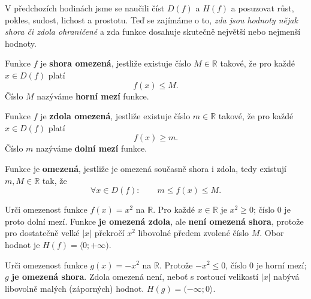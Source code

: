 \documentclass[11pt,a4paper]{article}
\begin{document}

V předchozích hodinách jsme se naučili číst $D(f)$ a $H(f)$
a posuzovat růst, pokles, sudost, lichost a prostotu.
Teď se zajímáme o to, \emph{zda jsou hodnoty nějak shora
či zdola ohraničené} a zda funkce dosahuje skutečně největší
nebo nejmenší hodnoty.

\begin{definiceBox}[title={Definice - Shora omezená funkce}]
Funkce $f$ je \textbf{shora omezená}, jestliže existuje
číslo $M\in\mathbb R$ takové, že pro každé $x\in D(f)$ platí
\[
f(x)\le M.
\]
Číslo $M$ nazýváme \textbf{horní mezí} funkce.
\end{definiceBox}
\begin{definiceBox}[title={Definice - Zdola omezená funkce}]
Funkce $f$ je \textbf{zdola omezená}, jestliže existuje
číslo $m\in\mathbb R$ takové, že pro každé $x\in D(f)$ platí
\[
f(x)\ge m.
\]
Číslo $m$ nazýváme \textbf{dolní mezí} funkce.
\end{definiceBox}
\begin{definiceBox}[title={Definice - Omezená funkce}]
Funkce je \textbf{omezená}, jestliže je omezená současně
shora i zdola, tedy existují $m,M\in\mathbb R$ tak, že
\[
\forall x\in D(f):\qquad m\le f(x)\le M.
\]
\end{definiceBox}

\begin{prikladReseniBox}[title={Příklad 1}]
Urči omezenost funkce $f(x)=x^2$ na $\mathbb R$.
\tcblower
Pro každé $x\in\mathbb R$ je $x^2\ge0$; číslo $0$ je
proto dolní mezí. Funkce \textbf{je omezená zdola},
ale \textbf{není omezená shora}, protože pro dostatečně velké
$|x|$ překročí $x^2$ libovolné předem zvolené číslo $M$.
Obor hodnot je $H(f)=\langle0;+\infty)$.
\end{prikladReseniBox}

\begin{prikladReseniBox}[title={Příklad 2}]
Urči omezenost funkce $g(x)=-x^2$ na $\mathbb R$.
\tcblower
Protože $-x^2\le0$, číslo $0$ je horní mezí;
$g$ \textbf{je omezená shora}. Zdola omezená není,
neboť s rostoucí velikostí $|x|$ nabývá libovolně malých
(záporných) hodnot. $H(g)=(-\infty;0\rangle$.
\end{prikladReseniBox}
\end{document}

